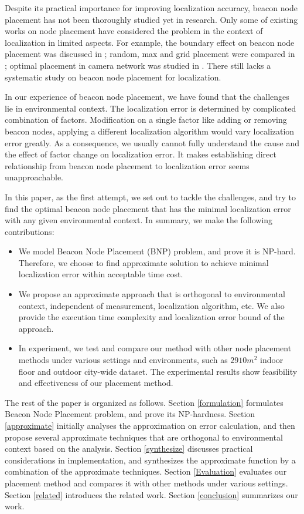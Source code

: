 \documentclass[10pt, conference, letterpaper]{IEEEtran}
\begin{document}
Despite its practical importance for improving localization accuracy, beacon node placement has not been thoroughly studied yet in research. Only some of existing works on node placement have considered the problem in the context of localization in limited aspects. For example, the boundary effect on beacon node placement was discussed in \cite{Boundary08}; random, max and grid placement were compared in \cite{Grid01}; optimal placement in camera network was studied in \cite{Camera06}. There still lacks a systematic study on beacon node placement for localization.

In our experience of beacon node placement, we have found that the challenges lie in environmental context. The localization error is determined by complicated combination of factors. Modification on a single factor like adding or removing beacon nodes, applying a different localization algorithm would vary localization error greatly. As a consequence, we usually cannot fully understand the cause and the effect of factor change on localization error. It makes establishing direct relationship from beacon node placement to localization error seems unapproachable.

In this paper, as the first attempt, we set out to tackle the challenges, and try to find the optimal beacon node placement that has the minimal localization error with any given environmental context. In summary, we make the following contributions:
\begin{itemize}
  \item We model Beacon Node Placement (BNP) problem, and prove it is NP-hard. Therefore, we choose to find approximate solution to achieve minimal localization error within acceptable time cost.
  \item We propose an approximate approach that is orthogonal to environmental context, independent of measurement, localization algorithm, etc. We also provide the execution time complexity and localization error bound of the approach.
  \item In experiment, we test and compare our method with other node placement methods under various settings and environments, such as $2910m^2$ indoor floor and outdoor city-wide dataset. The experimental results show feasibility and effectiveness of our placement method.
\end{itemize}

The rest of the paper is organized as follows. Section \ref{formulation} formulates Beacon Node Placement problem, and prove its NP-hardness. Section \ref{approximate} initially analyses the approximation on error calculation, and then propose several approximate techniques that are orthogonal to environmental context based on the analysis. Section \ref{synthesize} discusses practical considerations in implementation, and synthesizes the approximate function by a combination of the approximate techniques. Section \ref{Evaluation} evaluates our placement method and compares it with other methods under various settings. Section \ref{related} introduces the related work. Section \ref{conclusion} summarizes our work.
\end{document}
